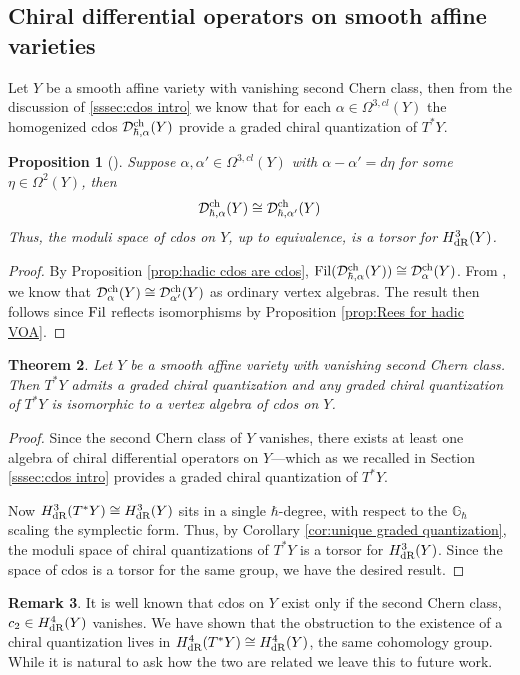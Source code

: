\documentclass[11pt]{amsart}
\numberwithin{equation}{section}
\newtheorem{theo}{Theorem}[section]
\newtheorem{prop}[theo]{Proposition}
\theoremstyle{definition}
\newtheorem{rmk}[theo]{Remark}
\newcommand{\D}{{\mathcal{D}}}
\newcommand{\dR}{{\textup{dR}}}
\newcommand{\ch}{{\textup{ch}}}
\newcommand{\0}{{\textbf{0}}}
\def\IG{\mathbb{G}}
\def\ch{{\rm ch}}
\begin{document}
\subsection{Chiral differential operators on smooth affine varieties}

Let $Y$ be a smooth affine variety with vanishing second Chern class, then from the discussion of \ref{sssec:cdos intro} we know that for each $\alpha\in \Omega^{3,cl}(Y)$ the homogenized cdos $\D^{\ch}_{\hbar,\alpha}(Y)$ provide a graded chiral quantization of $T^*Y$. 


\begin{prop}[\cite{GMS2,GMS3}]
 Suppose $\alpha,\alpha'\in \Omega^{3,cl}(Y)$ with $\alpha-\alpha'=d\eta$ for some $\eta\in \Omega^{2}(Y)$, then
 \[
 \D^\ch_{\hbar,\alpha}(Y) \cong \D^\ch_{\hbar,\alpha'}(Y)
 \]
 Thus, the moduli space of cdos on $Y$, up to equivalence, is a torsor for $H^3_{\rm dR}(Y)$.
\end{prop}
\begin{proof}
By Proposition \ref{prop:hadic cdos are cdos}, ${\rm Fil}(\D^\ch_{\hbar,\alpha}(Y))\cong \D^\ch_\alpha(Y)$. From \cite{GMS2}, we know that $\D^\ch_\alpha(Y)\cong \D^\ch_{\alpha'}(Y)$ as ordinary vertex algebras. The result then follows since ${\rm Fil}$ reflects isomorphisms by Proposition \ref{prop:Rees for hadic VOA}.
\end{proof}



\begin{theo}
	Let $Y$ be a smooth affine variety with vanishing second Chern class. Then $T^*Y$ admits a graded chiral quantization and any graded chiral quantization of $T^*Y$ is isomorphic to a vertex algebra of cdos on $Y$.
\end{theo}
\begin{proof}
	Since the second Chern class of $Y$ vanishes, there exists at least one algebra of chiral differential operators on $Y$---which as we recalled in Section \ref{sssec:cdos intro}  provides a graded chiral quantization of $T^*Y$. 

	Now $H^3_\dR(T^*Y)\cong H^3_{\dR}(Y)$ sits in a single $\hbar$-degree, with respect to the $\IG_\hbar$ scaling the symplectic form. Thus, by Corollary \ref{cor:unique graded quantization}, the moduli space of chiral quantizations of $T^*Y$ is a torsor for $H^3_{\dR}(Y)$. Since the space of cdos is a torsor for the same group, we have the desired result.
\end{proof}


\begin{rmk}
	It is well known that cdos on $Y$ exist only if the second Chern class, $c_2\in H^4_{\rm dR}(Y)$ vanishes. We have shown that the obstruction to the existence of a chiral quantization lives in $H^4_{\rm dR}(T^*Y)\cong H^4_{\rm dR}(Y)$, the same cohomology group. While it is natural to ask how the two are related we leave this to future work.
\end{rmk}
\end{document}
